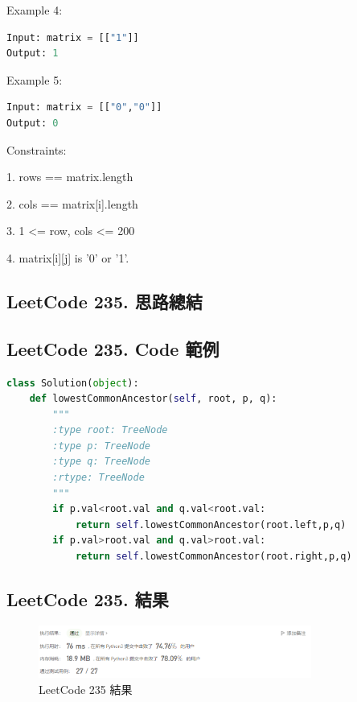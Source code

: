 \documentclass[10pt,UTF8]{ctexart}
\begin{document}
Example 4:

\begin{lstlisting}[language={python}]
Input: matrix = [["1"]]
Output: 1
\end{lstlisting}

Example 5:

\begin{lstlisting}[language={python}]
Input: matrix = [["0","0"]]
Output: 0
\end{lstlisting}

Constraints:

1. rows == matrix.length

2. cols == matrix[i].length

3. 1 <= row, cols <= 200

4. matrix[i][j] is '0' or '1'.

\subsection{LeetCode 235. 思路總結}

\subsection{LeetCode 235. Code 範例}

\begin{lstlisting}[language={python}]
class Solution(object):
    def lowestCommonAncestor(self, root, p, q):
        """
        :type root: TreeNode
        :type p: TreeNode
        :type q: TreeNode
        :rtype: TreeNode
        """
        if p.val<root.val and q.val<root.val:
            return self.lowestCommonAncestor(root.left,p,q)
        if p.val>root.val and q.val>root.val:
            return self.lowestCommonAncestor(root.right,p,q)
\end{lstlisting}

\subsection{LeetCode 235. 結果}

\begin{figure}[H]
\centering 
\includegraphics[width=0.80\textwidth]{lc-235-o.png} 
\caption{LeetCode 235 結果}
\label{Test}
\end{figure}
\end{document}
